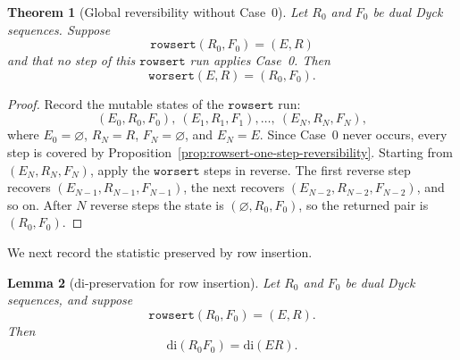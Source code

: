 \documentclass[11pt]{article}
\theoremstyle{plain}
\newtheorem{theorem}{Theorem}[section]
\newtheorem{lemma}[theorem]{Lemma}
\theoremstyle{definition}
\theoremstyle{remark}
\newcommand{\di}{\mathrm{di}}
\newcommand{\rowsert}{\texttt{rowsert}}
\newcommand{\worsert}{\texttt{worsert}}
\begin{document}
\begin{theorem}[Global reversibility without Case~0]
\label{thm:rowsert-global-reversibility}
Let \(R_0\) and \(F_0\) be dual Dyck sequences.  Suppose
\[
  \rowsert(R_0,F_0)=(E,R)
\]
and that no step of this \(\rowsert\) run applies Case~0.  Then
\[
  \worsert(E,R)=(R_0,F_0).
\]
\end{theorem}
\begin{proof}
Record the mutable states of the \(\rowsert\) run:
\[
  (E_0,R_0,F_0),\ (E_1,R_1,F_1),\ldots,\ (E_N,R_N,F_N),
\]
where \(E_0=\varnothing\), \(R_N=R\), \(F_N=\varnothing\), and \(E_N=E\).  Since
Case~0 never occurs, every step is covered by
Proposition~\ref{prop:rowsert-one-step-reversibility}.  Starting from
\((E_N,R_N,F_N)\), apply the \(\worsert\) steps in reverse.  The first
reverse step recovers \((E_{N-1},R_{N-1},F_{N-1})\), the next recovers
\((E_{N-2},R_{N-2},F_{N-2})\), and so on.  After \(N\) reverse steps the state
is \((\varnothing,R_0,F_0)\), so the returned pair is \((R_0,F_0)\).
\end{proof}
We next record the statistic preserved by row insertion.
\begin{lemma}[\(\di\)-preservation for row insertion]
\label{lem:rowsert-di-preservation}
Let \(R_0\) and \(F_0\) be dual Dyck sequences, and suppose
\[
  \rowsert(R_0,F_0)=(E,R).
\]
Then
\[
  \di(R_0F_0)=\di(ER).
\]
\end{lemma}
\end{document}
